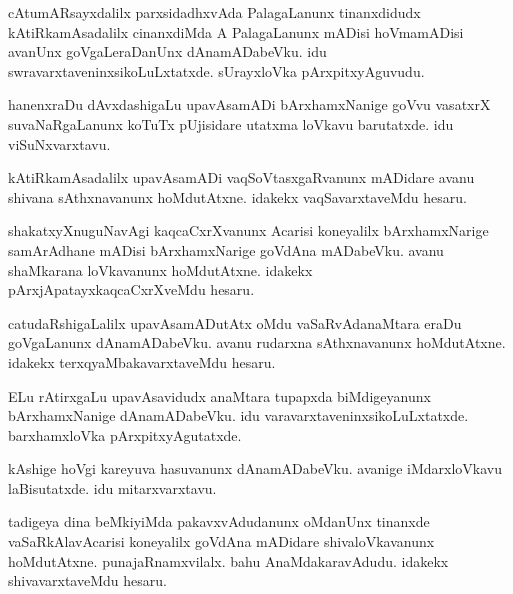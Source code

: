\documentclass{article}
\begin{document}
\begin{mn}
cAtumARsayxdalilx  parxsidadhxvAda  PalagaLanunx  tinanxdidudx  kAtiRkamAsadalilx  
cinanxdiMda  A  PalagaLanunx  mADisi  hoVmamADisi  avanUnx  goVgaLeraDanUnx  
dAnamADabeVku.  idu  swravarxtaveninxsikoLuLxtatxde.  sUrayxloVka  pArxpitxyAguvudu.
\end{mn}

\begin{mn}
hanenxraDu  dAvxdashigaLu  upavAsamADi  bArxhamxNanige  goVvu  vasatxrX  suvaNaRgaLanunx  
koTuTx  pUjisidare  utatxma loVkavu  barutatxde.  idu  viSuNxvarxtavu.
\end{mn}

\begin{mn}
kAtiRkamAsadalilx  upavAsamADi  vaqSoVtasxgaRvanunx  mADidare  avanu  shivana  
sAthxnavanunx  hoMdutAtxne.  idakekx  vaqSavarxtaveMdu  hesaru.
\end{mn}

\begin{mn}
shakatxyXnuguNavAgi  kaqcaCxrXvanunx  Acarisi  koneyalilx  bArxhamxNarige  samArAdhane  
mADisi  bArxhamxNarige  goVdAna mADabeVku.  avanu  shaMkarana  loVkavanunx  hoMdutAtxne.  
idakekx  pArxjApatayxkaqcaCxrXveMdu  hesaru.
\end{mn}

\begin{mn}
catudaRshigaLalilx  upavAsamADutAtx  oMdu  vaSaRvAdanaMtara  eraDu  goVgaLanunx  dAnamADabeVku.  
avanu  rudarxna  sAthxnavanunx  hoMdutAtxne.  idakekx  terxqyaMbakavarxtaveMdu  hesaru.
\end{mn}

\begin{mn}
ELu  rAtirxgaLu  upavAsavidudx  anaMtara  tupapxda  biMdigeyanunx  bArxhamxNanige  
dAnamADabeVku.  idu  varavarxtaveninxsikoLuLxtatxde.  barxhamxloVka  pArxpitxyAgutatxde.
\end{mn}

\begin{mn}
kAshige  hoVgi  kareyuva  hasuvanunx  dAnamADabeVku.  avanige  iMdarxloVkavu  
laBisutatxde.  idu  mitarxvarxtavu.
\end{mn}

\begin{mn}
tadigeya  dina  beMkiyiMda  pakavxvAdudanunx  oMdanUnx  tinanxde  vaSaRkAlavAcarisi  
koneyalilx  goVdAna mADidare  shivaloVkavanunx  hoMdutAtxne.  punajaRnamxvilalx.  
bahu  AnaMdakaravAdudu.  idakekx  shivavarxtaveMdu  hesaru.
\end{mn}
\end{document}

